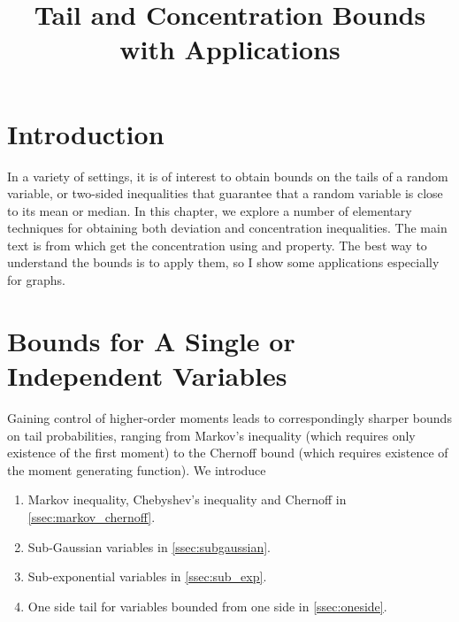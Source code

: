\documentclass{article}
\title{Tail and Concentration Bounds with Applications}
\begin{document}
\maketitle

\section{Introduction}
In a variety of settings, it is of interest to obtain bounds on the tails of a random variable, or two-sided inequalities that guarantee that a random variable is close to its mean or median. In this chapter, we explore a number of elementary techniques for obtaining both deviation and concentration inequalities. The main text is from \cite{wainwright2019high,mcdiarmid1989method} which get the concentration using  and  property. The best way to understand the bounds is to apply them, so I show some applications especially for graphs.
\section{Bounds for A Single or Independent Variables}
Gaining control of higher-order moments leads to correspondingly sharper bounds on tail probabilities, ranging from Markov’s inequality (which requires only existence of the first moment) to the Chernoff bound (which requires existence of the moment generating function). We introduce 
\begin{enumerate}
\item Markov inequality, Chebyshev's inequality and Chernoff in \cref{ssec:markov_chernoff}.
\item Sub-Gaussian variables in  \cref{ssec:subgaussian}.
\item Sub-exponential variables in  \cref{ssec:sub_exp}.
\item One side tail for variables bounded from one side in   \cref{ssec:oneside}.
\end{enumerate}
\end{document}
